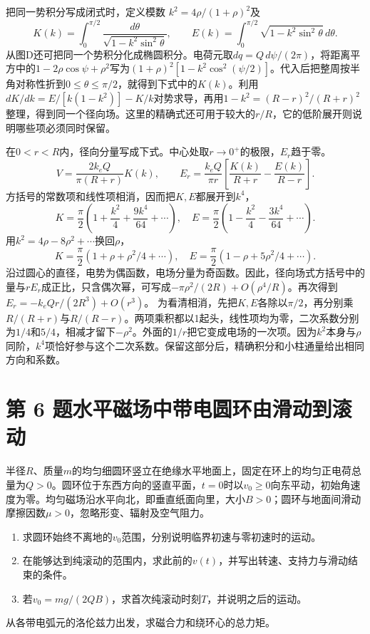\documentclass[UTF8,fontset=fandol,a4paper,11pt]{ctexart}
\begin{document}
把同一势积分写成闭式时，定义模数
$k^2=4\rho/(1+\rho)^2$及
\[
K(k)=\int_0^{\pi/2}\frac{d\theta}{\sqrt{1-k^2\sin^2\theta}},
\qquad
E(k)=\int_0^{\pi/2}\sqrt{1-k^2\sin^2\theta}\,d\theta.
\]
从图D还可把同一个势积分化成椭圆积分。电荷元取$dq=Q\,d\psi/(2\pi)$，将距离平方中的$1-2\rho\cos\psi+\rho^2$写为$(1+\rho)^2[1-k^2\cos^2(\psi/2)]$。代入后把整周按半角对称性折到$0\le\theta\le\pi/2$，就得到下式中的$K(k)$。利用$dK/dk=E/[k(1-k^2)]-K/k$对势求导，再用$1-k^2=(R-r)^2/(R+r)^2$整理，得到同一个径向场。这里的精确式还可用于较大的$r/R$，它的低阶展开则说明哪些项必须同时保留。

在$0<r<R$内，径向分量写成下式。中心处取$r\to0^+$的极限，$E_r$趋于零。
\[
V=\frac{2k_eQ}{\pi(R+r)}K(k),\qquad
E_r=\frac{k_eQ}{\pi r}
\left[\frac{K(k)}{R+r}-\frac{E(k)}{R-r}\right].
\]
方括号的常数项和线性项相消，因而把$K,E$都展开到$k^4$，
\[
K=\frac\pi2\left(1+\frac{k^2}{4}+\frac{9k^4}{64}+\cdots\right),
\quad
E=\frac\pi2\left(1-\frac{k^2}{4}-\frac{3k^4}{64}+\cdots\right).
\]
用$k^2=4\rho-8\rho^2+\cdots$换回$\rho$，
\[
K=\frac\pi2(1+\rho+\rho^2/4+\cdots),\quad
E=\frac\pi2(1-\rho+5\rho^2/4+\cdots).
\]
沿过圆心的直径，电势为偶函数，电场分量为奇函数。因此，径向场式方括号中的量与$r E_r$成正比，只含偶次幂，可写成$-\pi\rho^2/(2R)+O(\rho^4/R)$。再次得到
$E_r=-k_eQr/(2R^3)+O(r^3)$。
为看清相消，先把$K,E$各除以$\pi/2$，再分别乘$R/(R+r)$与$R/(R-r)$。两项乘积都以1起头，线性项均为零，二次系数分别为$1/4$和$5/4$，相减才留下$-\rho^2$。外面的$1/r$把它变成电场的一次项。因为$k^2$本身与$\rho$同阶，$k^4$项恰好参与这个二次系数。保留这部分后，精确积分和小柱通量给出相同方向和系数。





\section*{第 6 题\quad 水平磁场中带电圆环由滑动到滚动}\label{q:6}


半径$R$、质量$m$的均匀细圆环竖立在绝缘水平地面上，固定在环上的均匀正电荷总量为$Q>0$。圆环位于东西方向的竖直平面，$t=0$时以$v_0\geq0$向东平动，初始角速度为零。均匀磁场沿水平向北，即垂直纸面向里，大小$B>0$；圆环与地面间滑动摩擦因数$\mu>0$，忽略形变、辐射及空气阻力。
\begin{enumerate}
\item 求圆环始终不离地的$v_0$范围，分别说明临界初速与零初速时的运动。
\item 在能够达到纯滚动的范围内，求此前的$v(t)$，并写出转速、支持力与滑动结束的条件。
\item 若$v_0=mg/(2QB)$，求首次纯滚动时刻$T$，并说明之后的运动。
\end{enumerate}
从各带电弧元的洛伦兹力出发，求磁合力和绕环心的总力矩。
\end{document}
